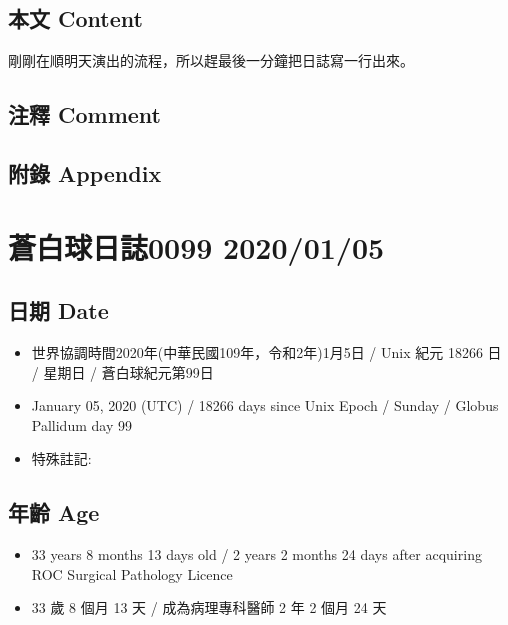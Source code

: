 \documentclass[a5paper, 12pt
]{book}
\providecommand{\tightlist}{%
  \setlength{\itemsep}{0pt}\setlength{\parskip}{0pt}}
\begin{document}
\hypertarget{ux672cux6587-content-34}{%
\subsection{本文 Content}\label{ux672cux6587-content-34}}

剛剛在順明天演出的流程，所以趕最後一分鐘把日誌寫一行出來。

\hypertarget{ux6ce8ux91cb-comment-33}{%
\subsection{注釋 Comment}\label{ux6ce8ux91cb-comment-33}}

\hypertarget{ux9644ux9304-appendix-34}{%
\subsection{附錄 Appendix}\label{ux9644ux9304-appendix-34}}

\hypertarget{ux84bcux767dux7403ux65e5ux8a8c0099-20200105}{%
\section{蒼白球日誌0099
2020/01/05}\label{ux84bcux767dux7403ux65e5ux8a8c0099-20200105}}

\hypertarget{ux65e5ux671f-date-35}{%
\subsection{日期 Date}\label{ux65e5ux671f-date-35}}

\begin{itemize}
\tightlist
\item
  世界協調時間2020年(中華民國109年，令和2年)1月5日 / Unix 紀元 18266 日
  / 星期日 / 蒼白球紀元第99日
\item
  January 05, 2020 (UTC) / 18266 days since Unix Epoch / Sunday / Globus
  Pallidum day 99
\item
  特殊註記:
\end{itemize}

\hypertarget{ux5e74ux9f61-age-35}{%
\subsection{年齡 Age}\label{ux5e74ux9f61-age-35}}

\begin{itemize}
\tightlist
\item
  33 years 8 months 13 days old / 2 years 2 months 24 days after
  acquiring ROC Surgical Pathology Licence
\item
  33 歲 8 個月 13 天 / 成為病理專科醫師 2 年 2 個月 24 天
\end{itemize}
\end{document}
